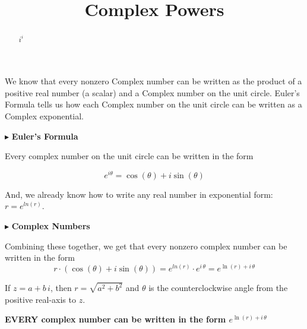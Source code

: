 \documentclass{ximera}
\title{Complex Powers}
\begin{document}
\begin{abstract}
$i^i$
\end{abstract}
\maketitle






We know that every nonzero Complex number can be written as the product of a positive real number (a scalar) and a Complex number on the unit circle.  Euler's Formula tells us how each Complex number on the unit circle can be written as a Complex exponential.


$\blacktriangleright$ \textbf{\textcolor{purple!85!blue}{Euler's Formula}}   


Every complex number on the unit circle can be written in the form


\[   e^{i \theta} = \cos(\theta) + i \sin(\theta)         \]


And, we already know how to write any real number in exponential form: $r = e^{ln(r)}$.  





$\blacktriangleright$ \textbf{\textcolor{purple!85!blue}{Complex Numbers}}   




Combining these together, we get that every nonzero complex number can be written in the form  
\[
r \cdot (\cos(\theta) + i \sin(\theta))  = e^{ln(r)} \cdot e^{i \, \theta} = e^{\ln(r) + i \, \theta}
\]



If $z = a + b \, i$, then $r = \sqrt{a^2 + b^2}$ and $\theta$ is the counterclockwise angle from the positive real-axis to $z$.




\begin{center}

\textbf{\textcolor{red!80!black}{EVERY complex number can be written in the form $e^{\ln(r) + i \, \theta}$}}

\end{center}
\end{document}
